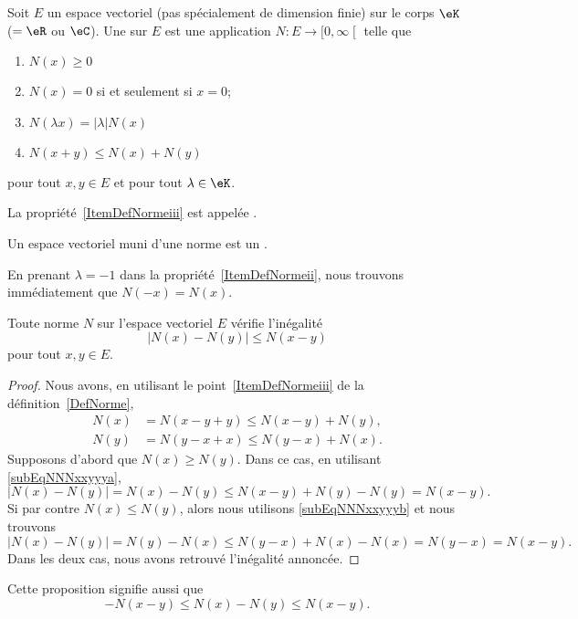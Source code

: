 \begin{definition}  \label{DefNorme}
	Soit \( E\) un espace vectoriel (pas spécialement de dimension finie) sur le corps \( \eK\) (\( =\eR\) ou \( \eC\)). Une   sur \( E\) est une application \( N\colon E\to\mathopen[ 0 , \infty \mathclose[\) telle que
	\begin{enumerate}
		\item
		      \( N(x)\geq 0\)
		\item
		      \( N(x)=0\) si et seulement si \( x=0\);
		      \item\label{ItemDefNormeii}
		      \( N(\lambda x)=| \lambda |N(x)\)
		      \item\label{ItemDefNormeiii}
		      \( N(x+y)\leq N(x)+N(y)\)
	\end{enumerate}
	pour tout \( x,y\in E\) et pour tout \( \lambda\in\eK\).

	La propriété~\ref{ItemDefNormeiii} est appelée .

	Un espace vectoriel muni d'une norme est un .
\end{definition}
En prenant \( \lambda=-1\) dans la propriété~\ref{ItemDefNormeii}, nous trouvons immédiatement que \( N(-x)=N(x)\).

\begin{proposition}		\label{PropNmNNm}
	Toute norme \( N\) sur l'espace vectoriel \( E\) vérifie l'inégalité
	\begin{equation}
		\big| N(x)-N(y) \big|\leq N(x-y)
	\end{equation}
	pour tout \( x,y\in E\).
\end{proposition}

\begin{proof}
	Nous avons, en utilisant le point~\ref{ItemDefNormeiii} de la définition~\ref{DefNorme},
	\begin{subequations}
		\begin{align}
			N(x) & =N(x-y+y)\leq N(x-y)+N(y),	\label{subEqNNNxxyyya} \\
			N(y) & =N(y-x+x)\leq N(y-x)+N(x).	\label{subEqNNNxxyyyb}
		\end{align}
	\end{subequations}
	Supposons d'abord que \( N(x)\geq N(y)\). Dans ce cas, en utilisant \eqref{subEqNNNxxyyya},
	\begin{equation}
		\big| N(x)-N(y) \big|=N(x)-N(y)\leq N(x-y)+N(y)-N(y)=N(x-y).
	\end{equation}
	Si par contre \( N(x)\leq N(y)\), alors nous utilisons \eqref{subEqNNNxxyyyb} et nous trouvons
	\begin{equation}
		\big| N(x)-N(y) \big|=N(y)-N(x)\leq N(y-x)+N(x)-N(x)=N(y-x)=N(x-y).
	\end{equation}
	Dans les deux cas, nous avons retrouvé l'inégalité annoncée.
\end{proof}
Cette proposition signifie aussi que
\begin{equation}	\label{EqNleqNNleqNvqlqbs}
	-N(x-y)\leq N(x)-N(y)\leq N(x-y).
\end{equation}


